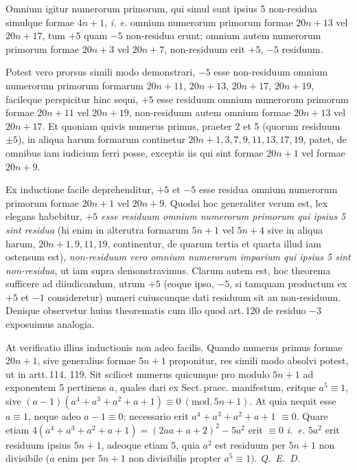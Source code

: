 
Omnium igitur numerorum primorum, qui simul sunt ipsius 5 non-residua simulque formae $4n+1$, \emph{i. e.} omnium numerorum primorum formae $20n+13$ vel $20n+17$, tum $+5$ quam $-5$ non-residua erunt; omnium autem numerorum primorum formae $20n+3$ vel $20n+7$, non-residuum erit $+5$, $-5$ residuum.

Potest vero prorsus simili modo demonstrari, $-5$ esse non-residuum omnium numerorum primorum formarum $20n+11$, $20n+13$, $20n+17$, $20n+19$, facileque perspicitur hinc sequi, $+5$ esse residuum omnium numerorum primorum formae $20n+11$ vel $20n+19$, non-residuum autem omnium formae $20n+13$ vel $20n+17$. Et quoniam quivis numerus primus, praeter 2 et 5 (quorum residuum $\pm 5$), in aliqua harum formarum continetur $20n+1,3,7,9,11,13,17,19$, patet, de omnibus iam iudicium ferri posse, exceptis iis qui sint formae $20n+1$ vel formae $20n+9$.


Ex inductione facile deprehenditur, $+5$ et $-5$ esse residua omnium numerorum primorum formae $20n+1$ vel $20n+9$. Quodsi hoc generaliter verum est, lex elegans habebitur, \emph{$+5$ esse residuum omnium numerorum primorum qui ipsius 5 sint residua} (hi enim in alterutra formarum $5n+1$ vel $5n+4$ sive in aliqua harum, $20n+1,9,11,19$, continentur, de quarum tertia et quarta illud iam ostensum est), \emph{non-residuum vero omnium numerorum imparium qui ipsius 5 sint non-residua}, ut iam supra demonstravimus. Clarum autem est, hoc theorema sufficere ad diiudicandum, utrum $+5$ (eoque ipso, $-5$, si tamquam productum ex $+5$ et $-1$ consideretur) numeri cuiuscunque dati residuum sit an non-residuum. Denique observetur huius theorematis cum illo quod art.\,120 de residuo $-3$ exposuimus analogia.

At verificatio illius inductionis non adeo facilis. Quando numerus primus formae $20n+1$, sive generalius formae $5n+1$ proponitur, res simili modo absolvi potest, ut in artt.\,114, 119. Sit scilicet numerus quicunque pro modulo $5n+1$ ad exponentem 5 pertinens $a$, quales dari ex Sect.\,praec. manifestum, eritque $a^5\equiv1$, sive $(a-1)(a^4+a^3+a^2+a+1)\equiv0\ (\mathrm{mod.}\,5n+1)$. At quia nequit esse $a\equiv1$, neque adeo $a-1\equiv0$; necessario erit $a^4+a^3+a^2+a+1$ $\equiv0$. Quare etiam $4(a^4+a^3+a^2+a+1)=(2aa+a+2)^2-5a^2$ erit $\equiv0$ \textit{i.\ e.} $5a^2$ erit residuum ipsius $5n+1$, adeoque etiam $5$, quia $a^2$ est residuum per $5n+1$ non divisibile ($a$ enim per $5n+1$ non divisibilis propter $a^5\equiv1)$. \textit{Q.\ E.\ D.}

